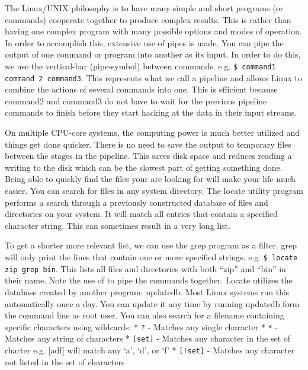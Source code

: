 The Linux/UNIX philosophy is to have many simple and short programs (or
commands) cooperate together to produce complex results. This is rather
than having one complex program with many possible options and modes of
operation. In order to accomplish this, extensive use of pipes is made.
You can pipe the output of one command or program into another as its
input. In order to do this, we use the vertical-bar \textbar{}
(pipe-symbol) between commands. e.g.
\texttt{\$ command1 \textbar{} command 2 \textbar{} command3}. This
represents what we call a pipeline and allows Linux to combine the
actions of several commands into one. This is efficient because command2
and command3 do not have to wait for the previous pipeline commands to
finish before they start hacking at the data in their input streams.

On multiple CPU-core systems, the computing power is much better
utilized and things get done quicker. There is no need to save the
output to temporary files between the stages in the pipeline. This saves
disk space and reduces reading a writing to the disk which can be the
slowest part of getting something done. Being able to quickly find the
files your are looking for will make your life much easier. You can
search for files in any system directory. The locate utility program
performs a search through a previously constructed database of files and
directories on your system. It will match all entries that contain a
specified character string. This can sometimes result in a very long
list.

To get a shorter more relevant list, we can use the grep program as a
filter. grep will only print the lines that contain one or more
specified strings. e.g. \texttt{\$ locate zip \textbar{} grep bin}. This
lists all files and directories with both ``zip'' and ``bin'' in their
name. Note the use of \textbar{} to pipe the commands together. Locate
utilizes the database created by another program: updatedb. Most Linux
systems run this automatically once a day. You can update it any time by
running updatedb form the command line as root user. You can also search
for a filename containing specific characters using wildcards: *
\texttt{?} - Matches any single character * \texttt{*} - Matches any
string of characters * \texttt{{[}set{]}} - Matches any character in the
set of charter e.g. {[}adf{]} will match any `a', `d', or `f' *
\texttt{{[}!set{]}} - Matches any character not listed in the set of
characters

